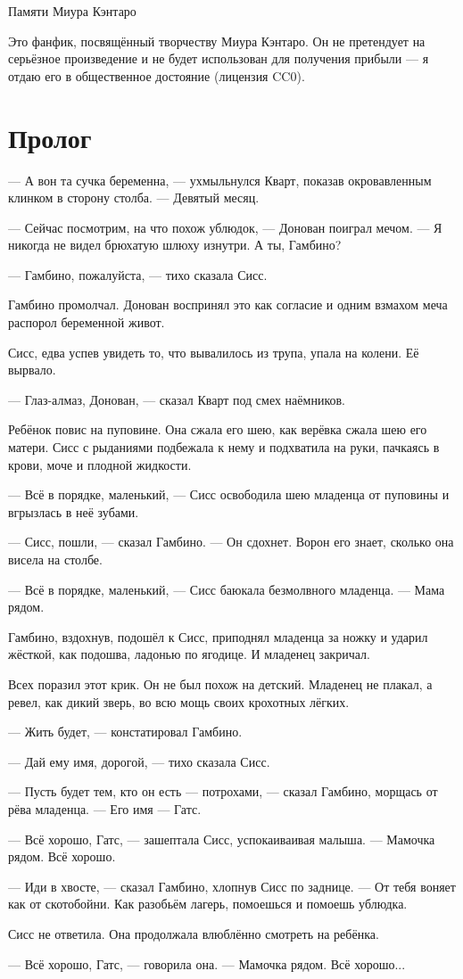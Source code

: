 Памяти Миура Кэнтаро

Это фанфик, посвящённый творчеству Миура Кэнтаро.
Он не претендует на серьёзное произведение и не будет использован для получения прибыли --- я отдаю его в общественное достояние (лицензия CC0).

\section{Пролог}

--- А вон та сучка беременна, --- ухмыльнулся Кварт, показав окровавленным клинком в сторону столба.
--- Девятый месяц.

--- Сейчас посмотрим, на что похож ублюдок, --- Донован поиграл мечом.
--- Я никогда не видел брюхатую шлюху изнутри.
А ты, Гамбино?

--- Гамбино, пожалуйста, --- тихо сказала Сисс.

Гамбино промолчал.
Донован воспринял это как согласие и одним взмахом меча распорол беременной живот.

Сисс, едва успев увидеть то, что вывалилось из трупа, упала на колени.
Её вырвало.

--- Глаз-алмаз, Донован, --- сказал Кварт под смех наёмников.

Ребёнок повис на пуповине.
Она сжала его шею, как верёвка сжала шею его матери.
Сисс с рыданиями подбежала к нему и подхватила на руки, пачкаясь в крови, моче и плодной жидкости.

--- Всё в порядке, маленький, --- Сисс освободила шею младенца от пуповины и вгрызлась в неё зубами.

--- Сисс, пошли, --- сказал Гамбино.
--- Он сдохнет.
Ворон его знает, сколько она висела на столбе.

--- Всё в порядке, маленький, --- Сисс баюкала безмолвного младенца.
--- Мама рядом.

Гамбино, вздохнув, подошёл к Сисс, приподнял младенца за ножку и ударил жёсткой, как подошва, ладонью по ягодице.
И младенец закричал.

Всех поразил этот крик.
Он не был похож на детский.
Младенец не плакал, а ревел, как дикий зверь, во всю мощь своих крохотных лёгких.

--- Жить будет, --- констатировал Гамбино.

--- Дай ему имя, дорогой, --- тихо сказала Сисс.

--- Пусть будет тем, кто он есть --- потрохами, --- сказал Гамбино, морщась от рёва младенца.
--- Его имя --- Гатс.

--- Всё хорошо, Гатс, --- зашептала Сисс, успокаиваивая малыша.
--- Мамочка рядом.
Всё хорошо.

--- Иди в хвосте, --- сказал Гамбино, хлопнув Сисс по заднице.
--- От тебя воняет как от скотобойни.
Как разобьём лагерь, помоешься и помоешь ублюдка.

Сисс не ответила.
Она продолжала влюблённо смотреть на ребёнка.

--- Всё хорошо, Гатс, --- говорила она.
--- Мамочка рядом.
Всё хорошо...
